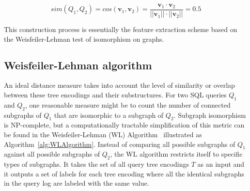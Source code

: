 \[
sim( Q_1 , Q_2 ) = cos(\pmb v_1 , \pmb v_2 ) = \frac {\pmb v_1 \cdot \pmb v_2 }{||\pmb v_1 || \cdot ||\pmb v_2 ||} = 0.5
\]

This construction process is essentially the feature extraction scheme based on the Weisfeiler-Lehman test of isomorphism on graphs.


\subsection{Weisfeiler-Lehman algorithm}
An ideal distance measure takes into account the level of similarity or overlap between these tree encodings and their substructures.  
For two SQL queries $Q_1$ and $Q_2$, one reasonable measure might be to count the number of connected subgraphs of $Q_1$ that are isomorphic to a subgraph of $Q_2$.  
Subgraph isomorphism is NP-complete, but a computationally tractable simplification of this metric can be found in the Weisfeiler-Lehman (WL) Algorithm~\cite{WL2011} illustrated as Algorithm~\ref{alg:WLAlgorithm}.
Instead of comparing all possible subgraphs of $Q_1$ against all possible subgraphs of $Q_2$, the WL algorithm restricts itself to specific types of subgraphs. It takes the set of all query tree encodings $T$ as an input and it outputs a set of labels for each tree encoding where all the identical subgraphs in the query log are labeled with the same value. 


